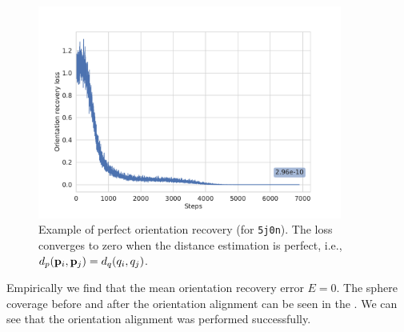 \begin{figure}[ht!]
    \centering
        \includegraphics[height=7cm]{figures/5j0n_perfect_angle_recovery}
    \caption{
        Example of perfect orientation recovery (for \texttt{5j0n}).
        The loss~ converges to zero when the distance estimation is perfect, i.e., $d_p(\mathbf{p}_i, \mathbf{p}_j) = d_q(q_i, q_j)$.
    }\label{fig:5j0n-orientation-recovery-loss}
\end{figure}

Empirically we find that the mean orientation recovery error  $E = 0$.
The sphere coverage before and after the orientation alignment can be seen in the .
We can see that the orientation alignment was performed successfully.

